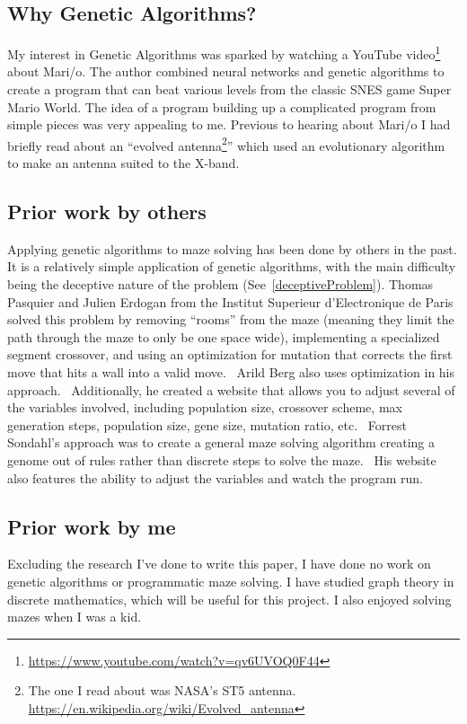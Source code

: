\documentclass[letterpaper, 12pt]{article}
\begin{document}
  \subsection{Why Genetic Algorithms?}
  My interest in Genetic Algorithms was sparked by watching a YouTube video\footnote{\url{https://www.youtube.com/watch?v=qv6UVOQ0F44}} about Mari/o. The author combined neural networks and genetic algorithms to create a program that can beat various levels from the classic SNES game Super Mario World. The idea of a program building up a complicated program from simple pieces was very appealing to me. Previous to hearing about Mari/o I had briefly read about an ``evolved antenna\footnote{The one I read about was NASA's ST5 antenna. \url{https://en.wikipedia.org/wiki/Evolved\_antenna} }'' which used an evolutionary algorithm to make an antenna suited to the X-band.~\cite{hornby2006antenna}
  \subsection{Prior work by others}
  Applying genetic algorithms to maze solving has been done by others in the past. It is a relatively simple application of genetic algorithms, with the main difficulty being the deceptive nature of the problem (See~\ref{deceptiveProblem}). Thomas Pasquier and Julien Erdogan from the Institut Superieur d'Electronique de Paris solved this problem by removing ``rooms'' from the maze (meaning they limit the path through the maze to only be one space wide), implementing a specialized segment crossover, and using an optimization for mutation that corrects the first move that hits a wall into a valid move.~\cite{thomas}
  Arild Berg also uses optimization in his approach.~\cite{ardid} Additionally, he created a website that allows you to adjust several of the variables involved, including population size, crossover scheme, max generation steps, population size, gene size, mutation ratio, etc.~\cite{ardid}
  Forrest Sondahl's approach was to create a general maze solving algorithm creating a genome out of rules rather than discrete steps to solve the maze.~\cite{sondahl}  His website also features the ability to adjust the variables and watch the program run.~\cite{sondahl}
  \subsection{Prior work by me}
    Excluding the research I've done to write this paper, I have done no work on genetic algorithms or programmatic maze solving. I have studied graph theory in discrete mathematics, which will be useful for this project. I also enjoyed solving mazes when I was a kid.  
\end{document}
